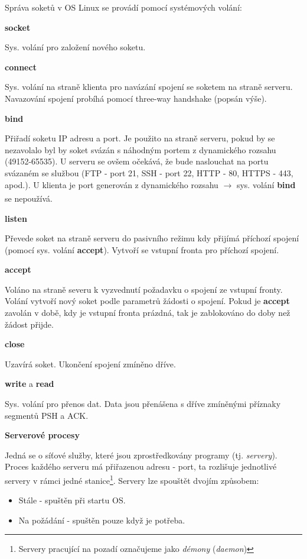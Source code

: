 Správa soketů v OS Linux se provádí pomocí systémových volání:

\vspace{0,5cm}
\textbf{socket}

Sys. volání pro založení nového soketu.

\vspace{0,5cm}
\textbf{connect}

Sys. volání na straně klienta pro navázání spojení se soketem na straně serveru. Navazování spojení probíhá pomocí three-way handshake (popsán výše).

\vspace{0,5cm}
\textbf{bind}

Přiřadí soketu IP adresu a port. Je použito na straně serveru, pokud by se nezavolalo byl by soket svázán s náhodným portem z dynamického rozsahu (49152-65535). U serveru se ovšem očekává, že bude naslouchat na portu svázaném se službou (FTP - port 21, SSH - port 22, HTTP - 80, HTTPS - 443, apod.). U klienta je port generován z dynamického rozsahu $\xrightarrow[]{}$ sys. volání \textbf{bind} se nepoužívá.  

\vspace{0,5cm}
\textbf{listen}

Převede soket na straně serveru do pasivního režimu kdy přijímá příchozí spojení (pomocí sys. volání \textbf{accept}). Vytvoří se vstupní fronta pro příchozí spojení.  

\vspace{0,5cm}
\textbf{accept}

Voláno na straně severu k vyzvednutí požadavku o spojení ze vstupní fronty. Volání vytvoří nový soket podle parametrů žádosti o spojení. Pokud je \textbf{accept} zavolán v době, kdy je vstupní fronta prázdná, tak je zablokováno do doby než žádost přijde.

\vspace{0,5cm}
\textbf{close}

Uzavírá soket. Ukončení spojení zmíněno dříve.

\vspace{0,5cm}
\textbf{write} a \textbf{read}

Sys. volání pro přenos dat. Data jsou přenášena s dříve zmíněnými příznaky segmentů PSH a ACK.

\newpage

\begin{Large} 
    \textbf{Serverové procesy}
\end{Large}

Jedná se o síťové služby, které jsou zprostředkovány programy (tj. \textit{servery}). Proces každého serveru má přiřazenou adresu - port, ta rozlišuje jednotlivé servery v rámci jedné stanice\footnote{Servery pracující na pozadí označujeme jako \textit{démony} (\textit{daemon})}. Servery lze spouštět dvojím způsobem:
\begin{itemize}
    \item Stále - spuštěn při startu OS.
    \item Na požádání - spuštěn pouze když je potřeba.
\end{itemize}

